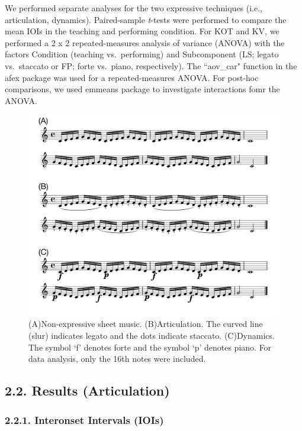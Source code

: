 \documentclass[
  english,
  man,floatsintext]{apa6}
\begin{document}
We performed separate analyses for the two expressive techniques (i.e., articulation, dynamics). Paired-sample \emph{t}-tests were performed to compare the mean IOIs in the teaching and performing condition. For KOT and KV, we performed a 2 x 2 repeated-measures analysis of variance (ANOVA) with the factors Condition (teaching vs.~performing) and Subcomponent (LS; legato vs.~staccato or FP; forte vs.~piano, respectively). The ``aov\_car" function in the afex package was used for a repeated-measures ANOVA. For post-hoc comparisons, we used emmeans package to investigate interactions fomr the ANOVA.

\begin{figure}
\includegraphics[width=1\linewidth]{manuscript_files/figure-latex/stim-1-1} \caption{\label{fig:stimuli}(A)Non-expressive sheet music. (B)Articulation. The curved line (slur) indicates legato and the dots indicate staccato. (C)Dynamics. The symbol `f' denotes forte and the symbol `p' denotes piano. For data analysis, only the 16th notes were included.}\label{fig:stim-1}
\end{figure}

\newpage

\hypertarget{results-articulation}{%
\subsection{2.2. Results (Articulation)}\label{results-articulation}}

\hypertarget{interonset-intervals-iois}{%
\subsubsection{2.2.1. Interonset Intervals (IOIs)}\label{interonset-intervals-iois}}
\end{document}
